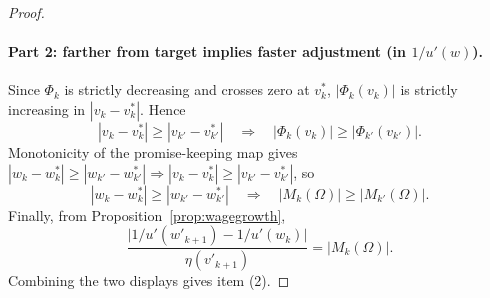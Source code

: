 \begin{proof}
\medskip
\noindent\paragraph{Part 2: farther from target implies faster adjustment (in $1/u'(w)$).}
Since $\Phi_k$ is strictly decreasing and crosses zero at $v_k^*$,
$|\Phi_k(v_k)|$ is strictly increasing in $|v_k-v_k^*|$. Hence
\[
|v_k-v_k^*|\ge |v_{k'}-v_{k'}^*|
\quad\Rightarrow\quad
|\Phi_k(v_k)|\ge |\Phi_{k'}(v_{k'})|.
\]
Monotonicity of the promise-keeping map gives $|w_k-w_k^*|\ge |w_{k'}-w_{k'}^*| \Rightarrow
|v_k-v_k^*|\ge |v_{k'}-v_{k'}^*|$, so
\[
|w_k-w_k^*|\ge |w_{k'}-w_{k'}^*|
\quad\Rightarrow\quad
|M_k(\Omega)|\ge |M_{k'}(\Omega)|.
\]
Finally, from Proposition~\ref{prop:wagegrowth},
\[
\frac{\big|1/u'(w'_{k+1})-1/u'(w_k)\big|}{\eta(v'_{k+1})}
=
|M_k(\Omega)|.
\]
Combining the two displays gives item (2).
\end{proof}


